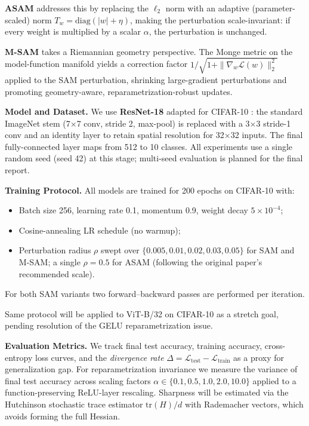 \documentclass{article}
\begin{document}
\textbf{ASAM} \citep{kwon2021asam} addresses this by replacing the $\ell_2$ norm with an adaptive (parameter-scaled) norm $T_w = \mathrm{diag}(|w| + \eta)$, making the perturbation scale-invariant: if every weight is multiplied by a scalar $\alpha$, the perturbation is unchanged.

\textbf{M-SAM} \citep{jacobsen2025msam} takes a Riemannian geometry perspective.  The Monge metric on the model-function manifold yields a correction factor $1/\sqrt{1 + \|\nabla_w \mathcal{L}(w)\|_2^2}$ applied to the SAM perturbation, shrinking large-gradient perturbations and promoting geometry-aware, reparametrization-robust updates.

\textbf{Model and Dataset.}
We use \textbf{ResNet-18} \citep{he2016resnet} adapted for CIFAR-10 \citep{krizhevsky2009cifar}: the standard ImageNet stem (7$\times$7 conv, stride 2, max-pool) is replaced with a 3$\times$3 stride-1 conv and an identity layer to retain spatial resolution for 32$\times$32 inputs.  The final fully-connected layer maps from 512 to 10 classes.  All experiments use a single random seed (seed 42) at this stage; multi-seed evaluation is planned for the final report.

\textbf{Training Protocol.}
All models are trained for 200 epochs on CIFAR-10 with:
\begin{itemize}[noitemsep,topsep=2pt]
  \item Batch size 256, learning rate 0.1, momentum 0.9, weight decay $5\times10^{-4}$;
  \item Cosine-annealing LR schedule (no warmup);
  \item Perturbation radius $\rho$ swept over $\{0.005, 0.01, 0.02, 0.03, 0.05\}$ for SAM and M-SAM; a single $\rho=0.5$ for ASAM (following the original paper's recommended scale).
\end{itemize}
For both SAM variants two forward–backward passes are performed per iteration.

Same protocol will be applied to ViT-B/32 on CIFAR-10 as a stretch goal, pending resolution of the GELU reparametrization issue.

\textbf{Evaluation Metrics.}
We track final test accuracy, training accuracy, cross-entropy loss curves, and the \emph{divergence rate} $\Delta = \mathcal{L}_\text{test} - \mathcal{L}_\text{train}$ as a proxy for generalization gap. For reparametrization invariance we measure the variance of final test accuracy across scaling factors $\alpha \in \{0.1, 0.5, 1.0, 2.0, 10.0\}$ applied to a function-preserving ReLU-layer rescaling.  Sharpness will be estimated via the Hutchinson stochastic trace estimator \citep{hutchinson1989stochastic} $\mathrm{tr}(H)/d$ with Rademacher vectors, which avoids forming the full Hessian.
\end{document}
